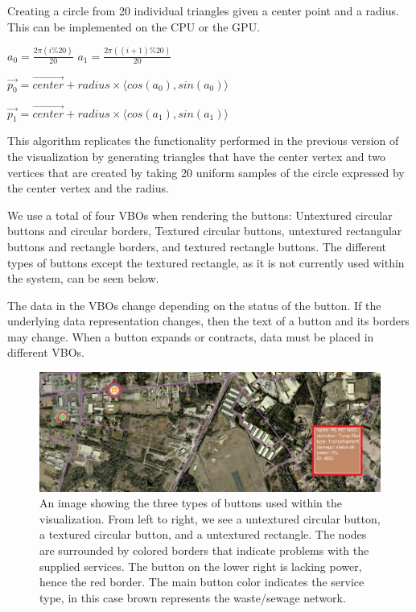 \begin{algorithm}
    \caption{Creating a circle from 20 individual triangles given a center point and a radius. This can be implemented on the CPU or the GPU.}
    \label{alg:circle_geometry}
    \begin{algorithmic}[1]
            \State $a_0 = \frac{2\pi(i \% 20 )}{20}$ 
            \State $a_1 = \frac{2\pi((i+1) \% 20 )}{20}$ 

            \State $\vec{p_0} = \vec{center} + radius \times \langle cos(a_0), sin(a_0) \rangle$
            \State {}

            \State {}

            \State $\vec{p_1} = \vec{center} + radius \times \langle cos(a_1), sin(a_1) \rangle$
            \State {}
        \EndFor
        \EndFunction
    \end{algorithmic}
\end{algorithm}

This algorithm replicates the functionality performed in the previous version of the visualization by 
generating triangles that have the center vertex and two vertices that are created by taking 
20 uniform samples of the circle expressed by the center vertex and the radius.

We use a total of four VBOs when rendering the buttons: Untextured circular buttons and circular borders,
Textured circular buttons, untextured rectangular buttons and rectangle borders, and textured rectangle 
buttons. The different types of buttons except the textured rectangle, as it is not currently used within the system, can be seen below.

The data in the VBOs change depending on the status of the button. If the underlying data representation changes, then the text of a button and its borders may change. When a button expands or contracts, data must be placed in different VBOs.

\begin{figure}[htp] \centering
    \includegraphics[width=0.8\linewidth]{img/button_types.jpg}
    \caption[Button Types]{An image showing the three types of buttons used within the visualization. From left to right, we see a untextured circular button, a textured circular button, and a untextured rectangle. The nodes are surrounded by colored borders that indicate problems with the supplied services. The button on the lower right is lacking power, hence the red border. The main button color indicates the service type, in this case brown represents the waste/sewage network. }
    \label{fig:button_types}
\end{figure}

